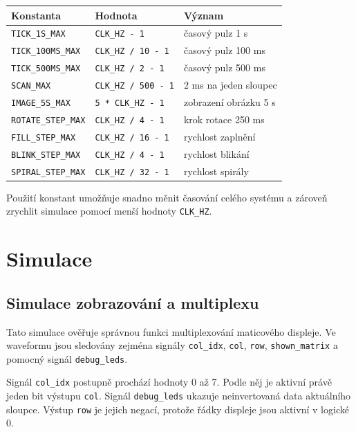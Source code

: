 \documentclass[11pt,a4paper]{article}
\begin{document}
\begin{center}
\begin{tabular}{|l|l|l|}
\hline
Konstanta & Hodnota & Význam \\
\hline
\texttt{TICK\_1S\_MAX} & \texttt{CLK\_HZ - 1} & časový pulz 1 s \\
\texttt{TICK\_100MS\_MAX} & \texttt{CLK\_HZ / 10 - 1} & časový pulz 100 ms \\
\texttt{TICK\_500MS\_MAX} & \texttt{CLK\_HZ / 2 - 1} & časový pulz 500 ms \\
\texttt{SCAN\_MAX} & \texttt{CLK\_HZ / 500 - 1} & 2 ms na jeden sloupec \\
\texttt{IMAGE\_5S\_MAX} & \texttt{5 * CLK\_HZ - 1} & zobrazení obrázku 5 s \\
\texttt{ROTATE\_STEP\_MAX} & \texttt{CLK\_HZ / 4 - 1} & krok rotace 250 ms \\
\texttt{FILL\_STEP\_MAX} & \texttt{CLK\_HZ / 16 - 1} & rychlost zaplnění \\
\texttt{BLINK\_STEP\_MAX} & \texttt{CLK\_HZ / 4 - 1} & rychlost blikání \\
\texttt{SPIRAL\_STEP\_MAX} & \texttt{CLK\_HZ / 32 - 1} & rychlost spirály \\
\hline
\end{tabular}
\end{center}

Použití konstant umožňuje snadno měnit časování celého systému a zároveň zrychlit simulace pomocí menší hodnoty \texttt{CLK\_HZ}.

\section{Simulace}

\subsection{Simulace zobrazování a multiplexu}

Tato simulace ověřuje správnou funkci multiplexování maticového displeje. Ve waveformu jsou sledovány zejména signály \texttt{col\_idx}, \texttt{col}, \texttt{row}, \texttt{shown\_matrix} a pomocný signál \texttt{debug\_leds}.

Signál \texttt{col\_idx} postupně prochází hodnoty 0 až 7. Podle něj je aktivní právě jeden bit výstupu \texttt{col}. Signál \texttt{debug\_leds} ukazuje neinvertovaná data aktuálního sloupce. Výstup \texttt{row} je jejich negací, protože řádky displeje jsou aktivní v logické 0.
\end{document}
